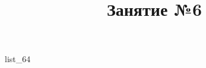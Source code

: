 \documentclass[12pt, a4paper]{article}
\begin{document}
	\title{Занятие №6}
	{list_64}
\end{document}
